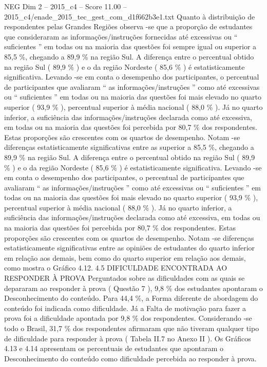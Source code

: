 \begin{textsample}{NEG Dim 2 – 2015\_c4 – Score 11.00 – 2015\_c4/enade\_2015\_tec\_gest\_com\_d1f662b3e1.txt}
Quanto à distribuição de respondentes pelas Grandes Regiões observa -se que a proporção de estudantes que consideraram as informações/instruções fornecidas até excessivas ou “ suficientes ” em todas ou na maioria das questões foi sempre igual ou superior a 85,5 \%, chegando a 89,9 \% na região Sul.
A diferença entre o percentual obtido na região Sul ( 89,9 \% ) e o da região Nordeste ( 85,6 \% ) é estatisticamente significativa.
Levando -se em conta o desempenho dos participantes, o percentual de participantes que avaliaram “ as informações/instruções ” como até excessivas ou “ suficientes ” em todas ou na maioria das questões foi mais elevado no quarto superior ( 93,9 \% ), percentual superior à média nacional ( 88,0 \% ).
Já no quarto inferior, a suficiência das informações/instruções declarada como até excessiva, em todas ou na maioria das questões foi percebida por 80,7 \% dos respondentes.
Estas proporções são crescentes com os quartos de desempenho.
Notam -se diferenças estatisticamente significativas entre as superior a 85,5 \%, chegando a 89,9 \% na região Sul.
A diferença entre o percentual obtido na região Sul ( 89,9 \% ) e o da região Nordeste ( 85,6 \% ) é estatisticamente significativa.
Levando -se em conta o desempenho dos participantes, o percentual de participantes que avaliaram “ as informações/instruções ” como até excessivas ou “ suficientes ” em todas ou na maioria das questões foi mais elevado no quarto superior ( 93,9 \% ), percentual superior à média nacional ( 88,0 \% ).
Já no quarto inferior, a suficiência das informações/instruções declarada como até excessiva, em todas ou na maioria das questões foi percebida por 80,7 \% dos respondentes.
Estas proporções são crescentes com os quartos de desempenho.
Notam -se diferenças estatisticamente significativas entre as opiniões de estudantes do quarto inferior em relação aos demais, bem como do quarto superior em relação aos demais, como mostra o Gráfico 4.12. 4.5 DIFICULDADE ENCONTRADA AO RESPONDER À PROVA Perguntados sobre as dificuldades com as quais se depararam ao responder à prova ( Questão 7 ), 9,8 \% dos estudantes apontaram o Desconhecimento do conteúdo.
Para 44,4 \%, a Forma diferente de abordagem do conteúdo foi indicada como dificuldade.
Já a Falta de motivação para fazer a prova foi a dificuldade apontada por 9,8 \% dos respondentes.
Considerando -se todo o Brasil, 31,7 \% dos respondentes afirmaram que não tiveram qualquer tipo de dificuldade para responder à prova ( Tabela II.7 no Anexo II ).
Os Gráficos 4.13 e 4.14 apresentam os percentuais de estudantes que apontaram o Desconhecimento do conteúdo como dificuldade percebida ao responder à prova.

\end{textsample}
